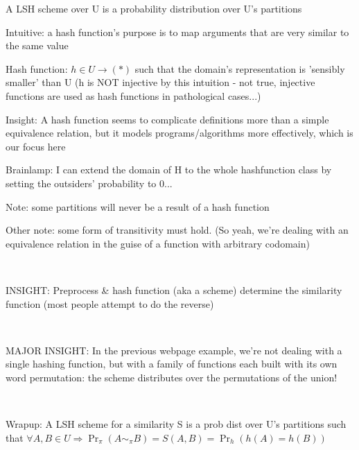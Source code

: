 \documentclass{report}
\begin{document}
	A LSH scheme over U is a probability distribution over U's partitions
	
	
	Intuitive: a hash function's purpose is to map arguments that are very similar to the same value
	
	Hash function: $h \in U \to (*)$ such that the domain's representation is 'sensibly smaller' than U (h is NOT injective by this intuition - not true, injective functions are used as hash functions in pathological cases...)
	
	Insight: A hash function seems to complicate definitions more than a simple equivalence relation, but it models programs/algorithms more effectively, which is our focus here
	
	
	
	Brainlamp: I can extend the domain of H to the whole hashfunction class by setting the outsiders' probability to 0...
	
	
	Note: some partitions will never be a result of a hash function %
	
	Other note: some form of transitivity must hold. (So yeah, we're dealing with an equivalence relation in the guise of a function with arbitrary codomain)
	
	\
	
	INSIGHT: Preprocess \& hash function (aka a scheme) determine the similarity function (most people attempt to do the reverse)
	
	\
	
	MAJOR INSIGHT: In the previous webpage example, we're not dealing with a single hashing function, but with a family of functions each built with its own word permutation: the scheme distributes over the permutations of the union!
	
	\
	
	Wrapup: A LSH scheme for a similarity S is a prob dist over U's partitions such that $\forall A, B \in  U \Rightarrow \Pr_\pi(A\sim_\pi B) = S(A, B) = \Pr_h(h(A)=h(B))$
	
\end{document}
